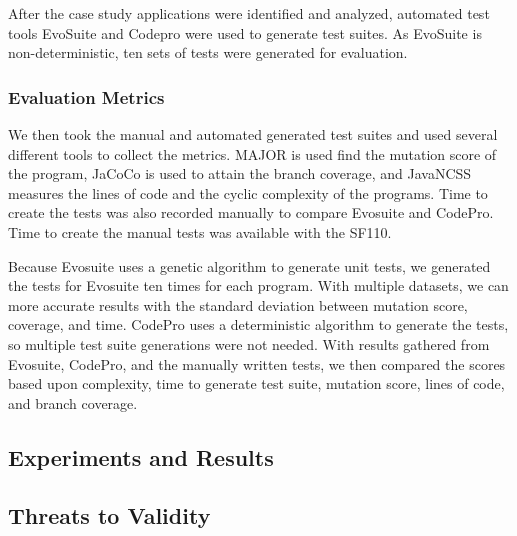 After the case study applications were identified and analyzed, automated test tools EvoSuite and Codepro were used to generate test suites. As EvoSuite is non-deterministic, ten sets of tests were generated for evaluation.  

\subsubsection{Evaluation Metrics}
We then took the manual and automated generated test suites and used several different tools to
collect the metrics. MAJOR is used find the mutation score of the program, JaCoCo is used to attain the branch coverage,
and JavaNCSS measures the lines of code and the cyclic complexity of the programs. Time to create the tests was also
recorded manually to compare Evosuite and CodePro. Time to create the manual tests was available with the SF110.

Because Evosuite uses a genetic algorithm to generate unit tests, we generated the tests for Evosuite ten times for each program. With multiple datasets, we can more accurate results with the standard deviation between mutation score, coverage, and time. CodePro uses a deterministic algorithm to generate the tests, so multiple test suite generations were not needed. With results gathered from Evosuite, CodePro, and the manually written tests, we then compared the scores based upon complexity, time to generate test suite, mutation score, lines of code, and branch coverage.

\subsection{Experiments and Results}

\subsection{Threats to Validity}
